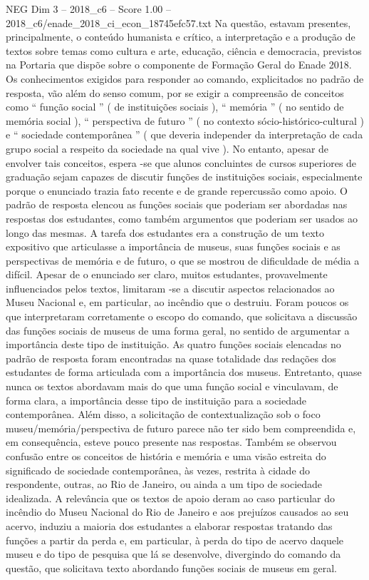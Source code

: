 \begin{textsample}{NEG Dim 3 – 2018\_c6 – Score 1.00 – 2018\_c6/enade\_2018\_ci\_econ\_18745efc57.txt}
Na questão, estavam presentes, principalmente, o conteúdo humanista e crítico, a interpretação e a produção de textos sobre temas como cultura e arte, educação, ciência e democracia, previstos na Portaria que dispõe sobre o componente de Formação Geral do Enade 2018.
Os conhecimentos exigidos para responder ao comando, explicitados no padrão de resposta, vão além do senso comum, por se exigir a compreensão de conceitos como “ função social ” ( de instituições sociais ), “ memória ” ( no sentido de memória social ), “ perspectiva de futuro ” ( no contexto sócio-histórico-cultural ) e “ sociedade contemporânea ” ( que deveria independer da interpretação de cada grupo social a respeito da sociedade na qual vive ).
No entanto, apesar de envolver tais conceitos, espera -se que alunos concluintes de cursos superiores de graduação sejam capazes de discutir funções de instituições sociais, especialmente porque o enunciado trazia fato recente e de grande repercussão como apoio.
O padrão de resposta elencou as funções sociais que poderiam ser abordadas nas respostas dos estudantes, como também argumentos que poderiam ser usados ao longo das mesmas.
A tarefa dos estudantes era a construção de um texto expositivo que articulasse a importância de museus, suas funções sociais e as perspectivas de memória e de futuro, o que se mostrou de dificuldade de média a difícil.
Apesar de o enunciado ser claro, muitos estudantes, provavelmente influenciados pelos textos, limitaram -se a discutir aspectos relacionados ao Museu Nacional e, em particular, ao incêndio que o destruiu.
Foram poucos os que interpretaram corretamente o escopo do comando, que solicitava a discussão das funções sociais de museus de uma forma geral, no sentido de argumentar a importância deste tipo de instituição.
As quatro funções sociais elencadas no padrão de resposta foram encontradas na quase totalidade das redações dos estudantes de forma articulada com a importância dos museus.
Entretanto, quase nunca os textos abordavam mais do que uma função social e vinculavam, de forma clara, a importância desse tipo de instituição para a sociedade contemporânea.
Além disso, a solicitação de contextualização sob o foco museu/memória/perspectiva de futuro parece não ter sido bem compreendida e, em consequência, esteve pouco presente nas respostas.
Também se observou confusão entre os conceitos de história e memória e uma visão estreita do significado de sociedade contemporânea, às vezes, restrita à cidade do respondente, outras, ao Rio de Janeiro, ou ainda a um tipo de sociedade idealizada.
A relevância que os textos de apoio deram ao caso particular do incêndio do Museu Nacional do Rio de Janeiro e aos prejuízos causados ao seu acervo, induziu a maioria dos estudantes a elaborar respostas tratando das funções a partir da perda e, em particular, à perda do tipo de acervo daquele museu e do tipo de pesquisa que lá se desenvolve, divergindo do comando da questão, que solicitava texto abordando funções sociais de museus em geral.

\end{textsample}
